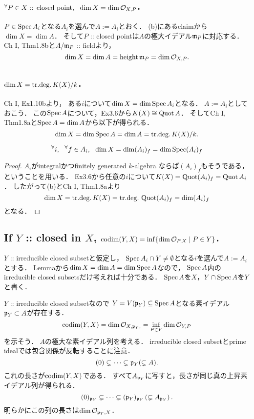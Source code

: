 \documentclass[a4paper]{jsarticle}
\begin{document}
    \subsection{${}^{\forall} P \in X\text{ :: closed point},~~ \dim X=\dim \mathcal{O}_{X,P}$.}
    $P \in \operatorname{Spec} A_i$となる$A_i$を選んで$A:=A_i$とおく．
    (b)にあるclaimから$\dim X=\dim A$．
    そして$P$ :: closed pointは$A$の極大イデアル$\mathfrak{m}_P$に対応する．
    Ch I, Thm1.8bと$A/\mathfrak{m}_P$ :: fieldより，
    \[ \dim X=\dim A=\operatorname{height} \mathfrak{m}_P=\dim \mathcal{O}_{X,P}. \]

    \subsection{$\dim X=\mathrm{tr.deg.\,} K(X)/k$.}
    Ch I, Ex1.10bより，
    ある$i$について$\dim X=\dim \operatorname{Spec} A_i$となる．
    $A:=A_i$としておこう．
    この$\operatorname{Spec} A$について，Ex3.6から$K(X) \cong \operatorname{Quot} A$．
    そしてCh I, Thm1.8aと$\operatorname{Spec} A=\dim A$から以下が得られる．
    \[ \dim X=\dim \operatorname{Spec} A=\dim A=\mathrm{tr.deg.\,} K(X)/k. \]

    \begin{Lemma}
    \[ {}^{\forall} i,~~ {}^{\forall} f \in A_i,~~ \dim X=\dim (A_i)_f=\dim \operatorname{Spec} (A_i)_f \] 
    \end{Lemma}
    \begin{proof}
        $A_i$がintegralかつfinitely generated $k$-algebra
        ならば$(A_i)_f$もそうである，ということを用いる．
        Ex3.6から任意の$i$について$K(X)=\operatorname{Quot} (A_i)_f=\operatorname{Quot} A_i$．
        したがって(b)とCh I, Thm1.8aより
        \[ \dim X=\mathrm{tr.deg.\,} K(X)=\mathrm{tr.deg.\,} \operatorname{Quot} (A_i)_f=\dim (A_i)_f \]
        となる．
    \end{proof}

    \subsection{If $Y$ :: closed in $X$, $\operatorname{codim}(Y,X)=\inf\{\dim \mathcal{O}_{P,X} \mid P \in Y\}$.}
    $Y$ :: irreducible closed subsetと仮定し，
    $\operatorname{Spec} A_i \cap Y \neq \emptyset$となる$i$を選んで$A:=A_i$とする．
    Lemmaから$\dim X=\dim A=\dim \operatorname{Spec} A$なので，
    $\operatorname{Spec} A$内のirreducible closed subsetsだけ考えれば十分である．
    $\operatorname{Spec} A$を$X$，$Y \cap \operatorname{Spec} A$を$Y$と書く．

    $Y$ :: irreducible closed subsetなので
    $Y=V(\mathfrak{p}_Y) \subseteq \operatorname{Spec} A$となる素イデアル$\mathfrak{p}_Y \subset A$が存在する．
    \[ \operatorname{codim}(Y,X)=\dim \mathcal{O}_{X, \mathfrak{p}_Y,}=\inf_{P \in Y} \dim \mathcal{O}_{Y,P} \]を示そう．
    $A$の極大な素イデアル列を考える．
    irreducible closed subsetとprime idealでは包含関係が反転することに注意．
    \[ (0) \subsetneq \dots \subsetneq \mathfrak{p}_Y (\subsetneq A). \]
    これの長さが$\operatorname{codim}(Y,X)$である．
    すべて$A_{\mathfrak{p}_Y}$に写すと，長さが同じ真の上昇素イデアル列が得られる．
    \[ (0)_{\mathfrak{p}_Y} \subsetneq \dots \subsetneq (\mathfrak{p}_Y)_{\mathfrak{p}_Y} \left(\subsetneq A_{\mathfrak{p}_Y} \right). \]
    明らかにこの列の長さは$\dim \mathcal{O}_{\mathfrak{p}_Y, X}$．
\end{document}
